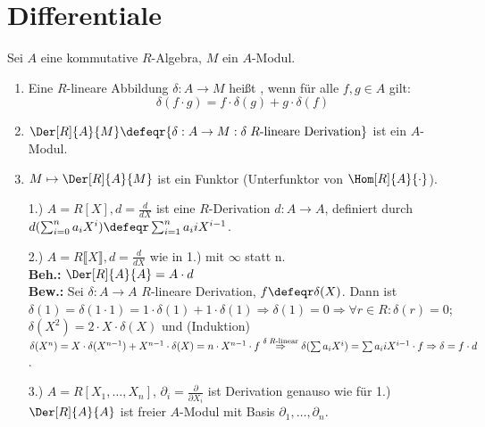 \section{Differentiale}

\begin{DefBem}
  Sei $A$ eine kommutative $R$-Algebra, $M$ ein $A$-Modul.

  \begin{enumerate}
    \item Eine $R$-lineare Abbildung $\delta: A \to M$ heißt
          , wenn für alle $f,g \in A$ gilt:
          \[\delta(f \cdot g) = f \cdot \delta(g) + g \cdot \delta(f)\]
    \item $\Der[R]{A}{M} \defeqr \{ \delta: A \to M: \delta \;
          R\text{-lineare Derivation}\}$ ist ein $A$-Modul.
    \item $M \mapsto \Der[R]{A}{M}$ ist ein Funktor (Unterfunktor von $\Hom[R]{A}{\cdot}$).
  \end{enumerate}
\end{DefBem}

\begin{nnBsp}
  \begin{enumerate}
    \item[1.)] $A = R[X], d = \frac{d}{dX}$ ist eine $R$-Derivation $d: A \to
               A$, definiert durch $d(\sum_{i=0}^n a_i X^i) \defeqr \sum_{i=1}^n a_i
               i X^{i-1}$.
    \item[2.)] $A = R \llbracket X \rrbracket, d = \frac{d}{dX}$ wie in 1.) mit
               $\infty$ statt n.\\
               \textbf{Beh.:} $\Der[R]{A}{A} = A \cdot d$\\
               \textbf{Bew.:} Sei $\delta: A \to A$ $R$-lineare Derivation, $f
               \defeqr \delta(X)$. Dann ist $\delta(1) = \delta(1 \cdot 1) =1 
               \cdot \delta(1) + 1 \cdot \delta(1) \Rightarrow \delta(1) = 0
               \Rightarrow \forall r \in R:\delta(r) = 0$; $\delta(X^2) = 2
               \cdot X \cdot \delta(X)$ und (Induktion) $\delta(X^n) = X \cdot
               \delta(X^{n-1}) + X^{n-1} \cdot \delta(X) = n \cdot X^{n-1}\cdot
               f \overset{\delta\; R\text{\scriptsize -linear}}{\Rightarrow}
               \delta(\sum a_i X^i) = \sum a_i i X^{i-1} \cdot f \Rightarrow
               \delta = f \cdot d$.
    \item[3.)] $A = R[X_1,\dots,X_n]$, $\partial_i = \frac{\partial}{\partial
               X_i}$ ist Derivation genauso wie für 1.)\\
               $\Der[R]{A}{A}$ ist freier $A$-Modul mit Basis $\partial_1,
               \dots , \partial_n$.
  \end{enumerate}
\end{nnBsp}

